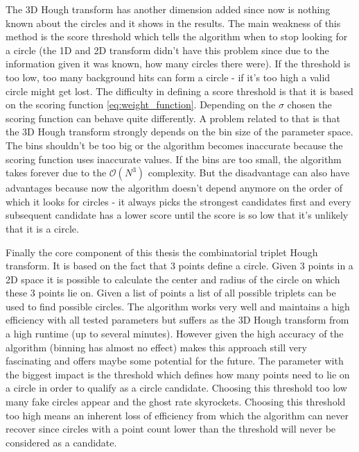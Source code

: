 \documentclass[11pt,twoside]{scrreprt}
\begin{document}
The 3D Hough transform has another dimension added since now is nothing known about the circles and it shows in the results. The main weakness
of this method is the score threshold which tells the algorithm when to stop looking for a circle (the 1D and 2D transform didn't
have this problem since due to the information given it was known, how many circles there were). If the threshold is too low, too many 
background hits can form a circle - if it's too high a valid circle might get lost. The difficulty in defining a score threshold is 
that it is based on the scoring function \ref{eq:weight_function}. Depending on the $\sigma$ chosen the scoring function can behave
quite differently. A problem related to that is that the 3D Hough transform strongly depends on the bin size of the parameter space.
The bins shouldn't be too big or the algorithm becomes inaccurate because the scoring function uses inaccurate values. If the bins are too
small, the algorithm takes forever due to the $\mathcal{O}(N^3)$ complexity. But the disadvantage can also have advantages because
now the algorithm doesn't depend anymore on the order of which it looks for circles - it always picks the strongest candidates first
and every subsequent candidate has a lower score until the score is so low that it's unlikely that it is a circle.

Finally the core component of this thesis the combinatorial triplet Hough transform. It is based on the fact that 3 points define a circle.
Given 3 points in a 2D space it is possible to calculate the center and radius of the circle on which these 3 points lie on. Given a list
of points a list of all possible triplets can be used to find possible circles. The algorithm works very well and maintains a high efficiency
with all tested parameters but suffers as the 3D Hough transform from a high runtime (up to several minutes). However given the high accuracy
of the algorithm (binning has almost no effect) makes this approach still very fascinating and offers maybe some potential for the future.
The parameter with the biggest impact is the threshold which defines how many points need to lie on a circle in order to qualify as a 
circle candidate. Choosing this threshold too low many fake circles appear and the ghost rate skyrockets. Choosing this threshold too high
means an inherent loss of efficiency from which the algorithm can never recover since circles with a point count lower than the threshold
will never be considered as a candidate.

\printbibliography
\end{document}
